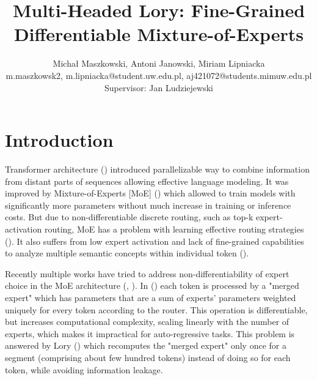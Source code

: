 \documentclass[12pt]{article}
\begin{document}
 
 
\title{Multi-Headed Lory: Fine-Grained Differentiable Mixture-of-Experts}%
\author{Michał Maszkowski, Antoni Janowski, Miriam Lipniacka\\ %
{m.maszkowsk2, m.lipniacka}@student.uw.edu.pl, aj421072@students.mimuw.edu.pl\\
Supervisor: Jan Ludziejewski}
\maketitle
 
\section{Introduction}
Transformer architecture (\cite{vaswani2017attention}) introduced parallelizable way to combine information from distant parts of sequences allowing effective language modeling. It was improved by Mixture-of-Experts [MoE] (\cite{shazeer2017outrageously}) which allowed to train models with significantly more parameters without much increase in training or inference costs. But due to non-differentiable discrete routing, such as top-k expert-activation routing, MoE has a problem with learning effective routing strategies (\cite{muqeeth2023soft}). It also suffers from low expert activation and lack of fine-grained capabilities to analyze multiple semantic concepts within individual token (\cite{wu2024multihead}).


Recently multiple works have tried to address non-differentiability of expert choice in the MoE architecture (\cite{Puigcerver2023FromST}, \cite{muqeeth2023soft}). In (\cite{muqeeth2023soft}) each token is processed  by a "merged expert" which has parameters that are a sum of experts' parameters weighted uniquely for every token according to the router. This operation is differentiable, but increases computational complexity, scaling linearly with the number of experts, which makes it impractical for auto-regressive tasks. This problem is answered by Lory (\cite{zhong2024lory}) which recomputes the "merged expert" only once for a segment (comprising about few hundred tokens) instead of doing so for each token, while avoiding information leakage.
\end{document}
